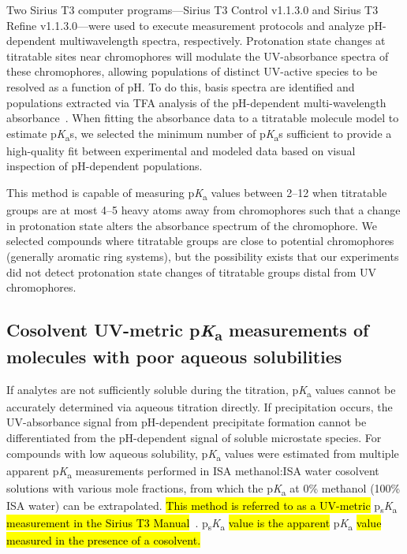 \documentclass[9pt,lineno]{elife}
\newcommand{\pKa}{p\textit{K}\textsubscript{a}}
\newcommand{\psKa}{p\textsubscript{s}\textit{K}\textsubscript{a}}
\begin{document}
Two Sirius T3 computer programs---Sirius T3 Control v1.1.3.0 and Sirius T3 Refine v1.1.3.0---were used to execute measurement protocols and analyze pH-dependent multiwavelength spectra, respectively.
Protonation state changes at titratable sites near chromophores will modulate the UV-absorbance spectra of these chromophores, allowing populations of distinct UV-active species to be resolved as a function of pH. 
To do this, basis spectra are identified and populations extracted via TFA analysis of the pH-dependent multi-wavelength absorbance~\citep{allen_multiwavelength_1998}. 
When fitting the absorbance data to a titratable molecule model to estimate \pKa{}s, we selected the minimum number of \pKa{}s sufficient to provide a high-quality fit between experimental and modeled data based on visual inspection of pH-dependent populations.

This method is capable of measuring \pKa{} values between 2--12 when titratable groups are at most 4--5 heavy atoms away from chromophores such that a change in protonation state alters the absorbance spectrum of the chromophore. 
We selected compounds where titratable groups are close to potential chromophores (generally aromatic ring systems), but the possibility exists that our experiments did not detect protonation state changes of titratable groups distal from UV chromophores.

\subsection{Cosolvent UV-metric \pKa{} measurements of molecules with poor aqueous solubilities}

If analytes are not sufficiently soluble during the titration, \pKa{} values cannot be accurately determined via aqueous titration directly. 
If precipitation occurs, the UV-absorbance signal from pH-dependent precipitate formation cannot be differentiated from the pH-dependent signal of soluble microstate species. 
For compounds with low aqueous solubility, \pKa{} values were estimated from multiple apparent \pKa{} measurements performed in ISA methanol:ISA water cosolvent solutions with various mole fractions, from which the \pKa{} at 0\% methanol (100\% ISA water) can be extrapolated. 
\hl{This method is referred to as a UV-metric} \psKa{} \hl{measurement in the Sirius T3 Manual}~\citep{noauthor_sirius_2008}. \psKa{} \hl{value is the apparent} \pKa{} \hl{value measured in the presence of a cosolvent.} 
\end{document}
